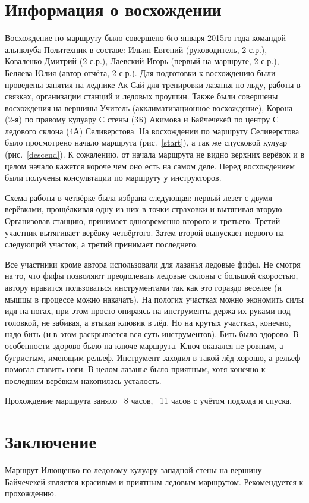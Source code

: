 \documentclass[fleqn, 10pt]{extarticle}
\begin{document}
\section{Информация о восхождении}
	Восхождение по маршруту было совершено 6го января 2015го года командой альпклуба Политехник в составе: Ильин Евгений (руководитель, 2 с.р.), Коваленко Дмитрий (2 с.р.),
	Лаевский Игорь (первый на маршруте, 2 с.р.), Беляева Юлия (автор отчёта, 2 с.р.). Для подготовки к восхождению были проведены занятия на леднике Ак-Сай для
	тренировки лазанья по льду, работы в связках, организации станций и ледовых проушин. Также были совершены восхождения на вершины Учитель (акклиматизационное восхождение),
	Корона (2-я) по правому кулуару С стены (3Б) Акимова и Байчечекей по центру С ледового склона (4А) Селиверстова. На восхождении по маршруту Селиверстова было просмотрено начало маршрута
	(рис.~\ref{start}), а так же спусковой кулуар (рис.~\ref{descend}). К сожалению, от начала маршрута не видно верхних верёвок и в целом начало кажется короче чем оно есть на самом деле.
	Перед восхождением были получены консультации по маршруту у инструкторов.

	Схема работы в четвёрке была избрана следующая: первый лезет с двумя верёвками, прощёлкивая одну из них в точки страховки и вытягивая вторую. Организовав станцию, принимает одновременно
	второго и третьего. Третий участник вытягивает верёвку четвёртого. Затем второй выпускает первого на следующий участок, а третий принимает последнего.

	Все участники кроме автора использовали для лазанья ледовые фифы. Не смотря на то, что фифы позволяют преодолевать ледовые склоны с большой скоростью, автору нравится пользоваться
	инструментами так как это гораздо веселее (и мышцы в процессе можно накачать). На пологих участках можно экономить силы идя на ногах, при этом просто опираясь на инструменты
	держа их руками под головкой, не забивая, а втыкая клювик в лёд. Но на крутых участках, конечно, надо бить (и в этом раскрывается вся суть инструментов). Бить было здорово.
	В особенности здорово было на ключе маршрута. Ключ оказался не ровным, а бугристым, имеющим рельеф. Инструмент заходил в такой лёд хорошо, а рельеф помогал ставить ноги. В целом лазанье
	было приятным, хотя конечно к последним верёвкам накопилась усталость.

	Прохождение маршрута заняло ~8 часов, ~11 часов с учётом подхода и спуска.

\section{Заключение}
	Маршрут Илющенко по ледовому кулуару западной стены на вершину Байчечекей является красивым и приятным ледовым маршрутом.
	Рекомендуется к прохождению.

\newpage
\nocite{*}


\end{document}
